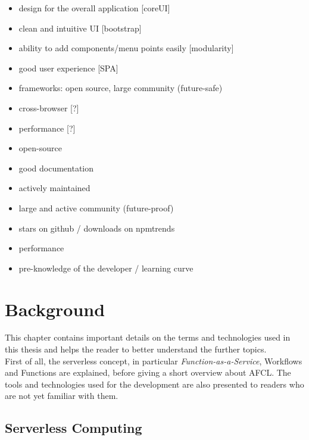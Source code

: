 \documentclass[a4paper,11pt,pdftex,halfparskip,cleardoubleempty,bibtotoc,liststotoc]{scrbook}
\begin{document}
\begin{itemize}
	\item design for the overall application [coreUI]
	\item clean and intuitive UI [bootstrap]
	\item ability to add components/menu points easily [modularity]
	\item good user experience [SPA]
	\item frameworks: open source, large community (future-safe)
	\item cross-browser [?]
	\item performance [?]
\end{itemize}
\begin{itemize}
	\item open-source
	\item good documentation
	\item actively maintained
	\item large and active community (future-proof)
	\item stars on github / downloads on npmtrends
	\item performance
	\item pre-knowledge of the developer / learning curve
\end{itemize}



\chapter{Background}

This chapter contains important details on the terms and technologies used in this thesis and helps the reader to better understand the further topics.\\
First of all, the serverless concept, in particular \emph{Function-as-a-Service}, Workflows and Functions are explained, before giving a short overview about AFCL. The tools and technologies used for the development are also presented to readers who are not yet familiar with them.

\section{Serverless Computing}
\end{document}

